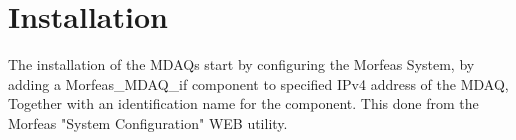 \section{Installation}
The installation of the MDAQs start by configuring the Morfeas System, by adding a Morfeas\_MDAQ\_if component to specified IPv4 address of the MDAQ,
Together with an identification name for the component. 
This done from the Morfeas "System Configuration" WEB utility.